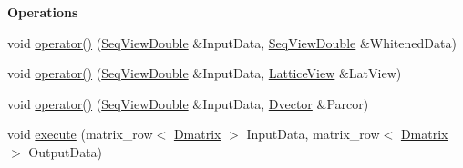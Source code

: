 \begin{Indent}\textbf{ Operations}\par
\begin{DoxyCompactItemize}
\item 
void \hyperlink{classtsa_1_1_l_s_l_learning_ac703af8aec35bece47d8b5dd5da96125}{operator()} (\hyperlink{namespacetsa_ac599574bcc094eda25613724b8f3ca9e}{Seq\+View\+Double} \&Input\+Data, \hyperlink{namespacetsa_ac599574bcc094eda25613724b8f3ca9e}{Seq\+View\+Double} \&Whitened\+Data)
\item 
void \hyperlink{classtsa_1_1_l_s_l_learning_a8a3c4b73d36808f940cd37fe8520d76f}{operator()} (\hyperlink{namespacetsa_ac599574bcc094eda25613724b8f3ca9e}{Seq\+View\+Double} \&Input\+Data, \hyperlink{classtsa_1_1_lattice_view}{Lattice\+View} \&Lat\+View)
\item 
void \hyperlink{classtsa_1_1_l_s_l_learning_adaf7049997744cc383427c0c673549f7}{operator()} (\hyperlink{namespacetsa_ac599574bcc094eda25613724b8f3ca9e}{Seq\+View\+Double} \&Input\+Data, \hyperlink{namespacetsa_a8900fb03d849baf447a1a0efe2561fb2}{Dvector} \&Parcor)
\item 
void \hyperlink{classtsa_1_1_l_s_l_learning_a9ec866ab1a8d8173e77519ce9f9855d5}{execute} (matrix\+\_\+row$<$ \hyperlink{namespacetsa_ad260cd21c1891c4ed391fe788569aba4}{Dmatrix} $>$ Input\+Data, matrix\+\_\+row$<$ \hyperlink{namespacetsa_ad260cd21c1891c4ed391fe788569aba4}{Dmatrix} $>$ Output\+Data)
\end{DoxyCompactItemize}
\end{Indent}
